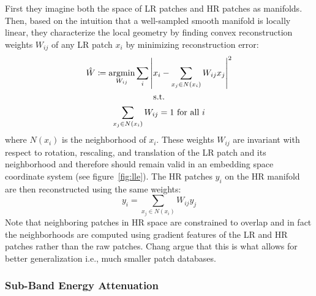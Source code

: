 %
First they imagine both the space of LR patches and HR patches as manifolds.
%
Then, based on the intuition that a well-sampled smooth manifold is locally linear, they characterize the local geometry by finding convex reconstruction weights \(W_{ij}\) of any LR patch \(x_i\) by minimizing reconstruction error:
\begin{gather}
    \hat{W} \coloneqq \underset{W_{ij}}{\text{argmin}} \sum_i \abs{ x_i - \sum_{x_j \in N(x_i)} W_{ij} x_j  }^2 \nonumber \\
    \text{s.t.} \\
    \sum_{x_j \in N(x_i)} W_{ij} = 1 \text{ for all }i \nonumber
\end{gather}
where \(N(x_i)\) is the neighborhood of \(x_i\).
%
These weights \(W_{ij}\) are invariant with respect to rotation, rescaling, and translation of the LR patch and its neighborhood \cite{saul2000introduction} and therefore should remain valid in an embedding space coordinate system (see figure~\ref{fig:lle}).
%
The HR patches \(y_i\) on the HR manifold are then reconstructed using the same weights:
\begin{equation}
    y_i = \sum_{x_j \in N(x_i)} W_{ij} y_j
\end{equation}
%
Note that neighboring patches in HR space are constrained to overlap and in fact the neighborhoods are computed using gradient features of the LR and HR patches rather than the raw patches.
%
Chang \etal argue that this is what allows for better generalization i.e., much smaller patch databases.

\subsubsection{Sub-Band Energy Attenuation}\label{subsubsec:subband}

